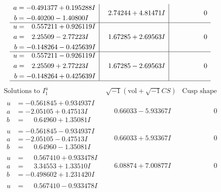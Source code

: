 \documentclass[1p]{elsarticle_modified}
\theoremstyle{definition}
\newcommand{\I}{\sqrt{-1}}
\begin{document}
$$\begin{array}{c|c|c}
\begin{aligned}
a &= -0.491377 + 0.195288 I \\
b &= -0.40200 - 1.40800 I\end{aligned}
 & \phantom{-}2.74244 + 4.81471 I & \phantom{-0.000000 } 0 \\ \hline\begin{aligned}
u &= \phantom{-}0.557211 + 0.926119 I \\
a &= \phantom{-}2.25509 - 2.77223 I \\
b &= -0.148264 - 0.425639 I\end{aligned}
 & \phantom{-}1.67285 + 2.69563 I & \phantom{-0.000000 } 0 \\ \hline\begin{aligned}
u &= \phantom{-}0.557211 - 0.926119 I \\
a &= \phantom{-}2.25509 + 2.77223 I \\
b &= -0.148264 + 0.425639 I\end{aligned}
 & \phantom{-}1.67285 - 2.69563 I & \phantom{-0.000000 } 0\\
 \hline 
 \end{array}$$\newpage$$\begin{array}{c|c|c}  
\text{Solutions to }I^u_{1}& \I (\text{vol} + \sqrt{-1}CS) & \text{Cusp shape}\\
 \hline 
\begin{aligned}
u &= -0.561845 + 0.934937 I \\
a &= -2.05105 + 0.47513 I \\
b &= \phantom{-}0.64960 + 1.35081 I\end{aligned}
 & \phantom{-}0.66033 - 5.93367 I & \phantom{-0.000000 } 0 \\ \hline\begin{aligned}
u &= -0.561845 - 0.934937 I \\
a &= -2.05105 - 0.47513 I \\
b &= \phantom{-}0.64960 - 1.35081 I\end{aligned}
 & \phantom{-}0.66033 + 5.93367 I & \phantom{-0.000000 } 0 \\ \hline\begin{aligned}
u &= \phantom{-}0.567410 + 0.933478 I \\
a &= \phantom{-}3.34553 + 1.33510 I \\
b &= -0.498602 + 1.231420 I\end{aligned}
 & \phantom{-}6.08874 + 7.00877 I & \phantom{-0.000000 } 0 \\ \hline\begin{aligned}
u &= \phantom{-}0.567410 - 0.933478 I \\

\end{aligned}
\end{array}$$
\end{document}
